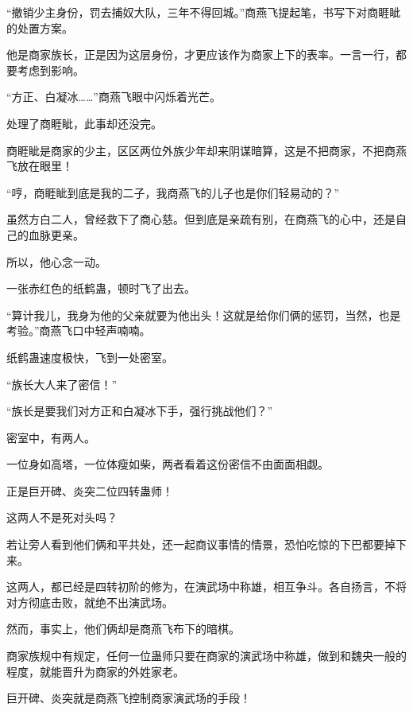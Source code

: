 \begin{this_body}
“撤销少主身份，罚去捕奴大队，三年不得回城。”商燕飞提起笔，书写下对商睚眦的处置方案。

他是商家族长，正是因为这层身份，才更应该作为商家上下的表率。一言一行，都要考虑到影响。

“方正、白凝冰……”商燕飞眼中闪烁着光芒。

处理了商睚眦，此事却还没完。

商睚眦是商家的少主，区区两位外族少年却来阴谋暗算，这是不把商家，不把商燕飞放在眼里！

“哼，商睚眦到底是我的二子，我商燕飞的儿子也是你们轻易动的？”

虽然方白二人，曾经救下了商心慈。但到底是亲疏有别，在商燕飞的心中，还是自己的血脉更亲。

所以，他心念一动。

一张赤红色的纸鹤蛊，顿时飞了出去。

“算计我儿，我身为他的父亲就要为他出头！这就是给你们俩的惩罚，当然，也是考验。”商燕飞口中轻声喃喃。

纸鹤蛊速度极快，飞到一处密室。

“族长大人来了密信！”

“族长是要我们对方正和白凝冰下手，强行挑战他们？”

密室中，有两人。

一位身如高塔，一位体瘦如柴，两者看着这份密信不由面面相觑。

正是巨开碑、炎突二位四转蛊师！

这两人不是死对头吗？

若让旁人看到他们俩和平共处，还一起商议事情的情景，恐怕吃惊的下巴都要掉下来。

这两人，都已经是四转初阶的修为，在演武场中称雄，相互争斗。各自扬言，不将对方彻底击败，就绝不出演武场。

然而，事实上，他们俩却是商燕飞布下的暗棋。

商家族规中有规定，任何一位蛊师只要在商家的演武场中称雄，做到和魏央一般的程度，就能晋升为商家的外姓家老。

巨开碑、炎突就是商燕飞控制商家演武场的手段！

\end{this_body}

